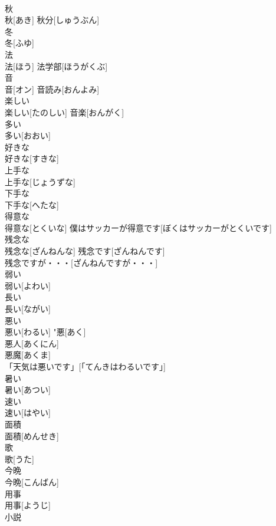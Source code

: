 \documentclass[8pt]{extreport}
\begin{document}
\begin{CJK}{UTF8}{min}
\\	秋	
\\	秋[あき]	秋分[しゅうぶん] 
\\	冬	
\\	冬[ふゆ]	
\\	法	
\\	法[ほう]	法学部[ほうがくぶ] 
\\	音	
\\	音[オン]	音読み[おんよみ] 
\\	楽しい	
\\	楽しい[たのしい]	音楽[おんがく] 
\\	多い	
\\	多い[おおい]	
\\	好きな	
\\	好きな[すきな]	
\\	上手な	
\\	上手な[じょうずな]	
\\	下手な	
\\	下手な[へたな]	
\\	得意な	
\\	得意な[とくいな]	僕はサッカーが得意です[ぼくはサッカーがとくいです] 
\\	残念な	
\\	残念な[ざんねんな]	残念です[ざんねんです] 
\\	残念ですが・・・[ざんねんですが・・・] 
\\	弱い	
\\	弱い[よわい]	
\\	長い	
\\	長い[ながい]	
\\	悪い	
\\	悪い[わるい]	"悪[あく] 
\\	悪人[あくにん] 
\\	悪魔[あくま] 
\\	「天気は悪いです」[「てんきはわるいです」] 
\\	暑い	
\\	暑い[あつい]	
\\	速い	
\\	速い[はやい]	
\\	面積	
\\	面積[めんせき]	
\\	歌	
\\	歌[うた]	
\\	今晩	
\\	今晩[こんばん]	
\\	用事	
\\	用事[ようじ]	
\\	小説	

\end{CJK}
\end{document}
